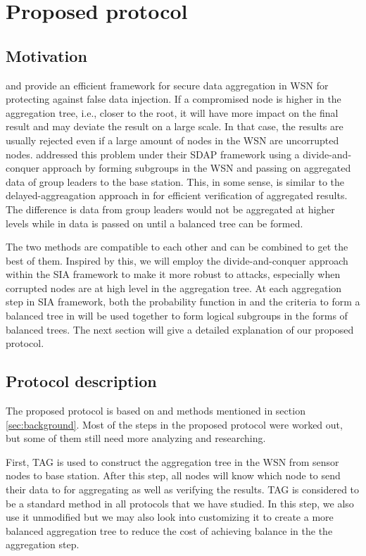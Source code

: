 \documentclass[a4paper]{article}
\begin{document}
\section{Proposed protocol}
\label{sec:protocol}

\subsection{Motivation}

\cite{SIA} and \cite{Chan06} provide an efficient framework for secure data
aggregation in WSN for protecting against false data injection. If a
compromised node is higher in the aggregation tree, i.e., closer to the root,
it will have more impact on the final result and may deviate the result on a
large scale.  In that case, the results are usually rejected even if a large
amount of nodes in the WSN are uncorrupted nodes. \cite{SDAP} addressed this
problem under their SDAP framework using a divide-and-conquer approach by
forming subgroups in the WSN and passing on aggregated data of group leaders
to the base station. This, in some sense, is similar to the
delayed-aggreagation approach in \cite{Chan06} for efficient verification of
aggregated results. The difference is data from group leaders would not be
aggregated at higher levels while in \cite{Chan06} data is passed on until a
balanced tree can be formed.

The two methods are compatible to each other and can be combined to get the
best of them. Inspired by this, we will employ the divide-and-conquer approach
within the SIA framework to make it more robust to attacks, especially when
corrupted nodes are at high level in the aggregation tree. At each aggregation
step in SIA framework, both the probability function in \cite{Chan06} and the
criteria to form a balanced tree in \cite{SDAP} will be used together to form
logical subgroups in the forms of balanced trees. The next section will give a
detailed explanation of our proposed protocol.

\subsection{Protocol description}

The proposed protocol is based on \cite{Chan06} and methods mentioned
in section \ref{sec:background}. Most of the steps in the proposed protocol
were worked out, but some of them still need more analyzing and researching.

First, TAG \cite{tag} is used to construct the aggregation tree in the WSN
from sensor nodes to base station. After this step, all nodes will know which
node to send their data to for aggregating as well as verifying the
results. TAG is considered to be a standard method in all protocols that we
have studied. In this step, we also use it unmodified but we may also look
into customizing it to create a more balanced aggregation tree to reduce the
cost of achieving balance in the the aggregation step.
\end{document}
